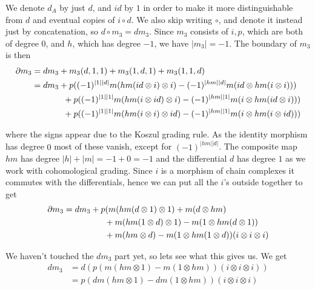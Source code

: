 We denote $d_A$ by just $d$, and $id$ by $1$ in order to make it more distinguishable from $d$ and eventual copies of $i\circ d$. We also skip writing $\circ$, and denote it instead just by concatenation, so $d\circ m_3 = dm_3$. Since $m_3$ consists of $i, p$, which are both of degree $0$, and $h$, which has degree $-1$, we have $|m_3|=-1$. The boundary of $m_3$ is then
\begin{align*}
    \partial m_3 
    &= dm_3+m_3(d,1,1)+m_3(1,d,1)+m_3(1,1,d)\\
    &= dm_3
    +p((-1)^{|1||d|}m(hm(id\otimes i)\otimes i)
    -(-1)^{|hm||d|}m(id\otimes hm(i\otimes i))) \\
    & \hspace{13mm} 
    +p((-1)^{|1||1|}m(hm(i\otimes id)\otimes i)
    -(-1)^{|hm||1|}m(i\otimes hm(id\otimes i))) \\
    & \hspace{13mm} 
    +p((-1)^{|1||1|}m(hm(i\otimes i)\otimes id)
    -(-1)^{|hm||1|}m(i\otimes hm(i\otimes id)))
\end{align*}

where the signs appear due to the Koszul grading rule. As the identity morphism has degree $0$ most of these vanish, except for $(-1)^{|hm||d|}$. The composite map $hm$ has degree $|h|+|m| = -1+0 = -1$ and the differential $d$ has degree $1$ as we work with cohomological grading. Since $i$ is a morphism of chain complexes it commutes with the differentials, hence we can put all the $i$'s outside together to get 
\begin{align*}
    \partial m_3 
    &= dm_3
    +p(m(hm(d\otimes 1)\otimes 1)
    +m(d\otimes hm) \\
    & \hspace{17mm} 
    +m(hm(1\otimes d)\otimes 1)
    -m(1\otimes hm(d\otimes 1)) \\
    & \hspace{17mm} 
    +m(hm\otimes d)
    -m(1\otimes hm(1\otimes d))(i\otimes i\otimes i)
\end{align*}

We haven't touched the $dm_3$ part yet, so lets see what this gives us. We get 
\begin{align*}
    dm_3 
    &= 
    d(p(m(hm\otimes 1)
    -m(1\otimes hm))(i\otimes i\otimes i)) \\
    &= 
    p(dm(hm\otimes 1)
    -dm(1\otimes hm))(i\otimes i\otimes i) \\
\end{align*}

